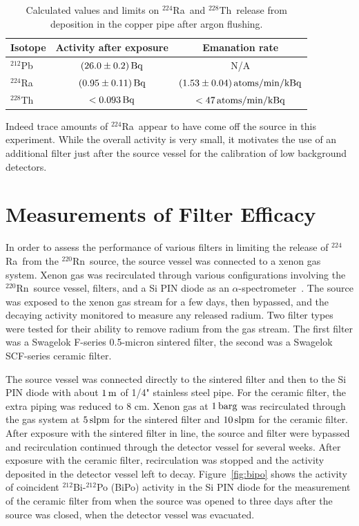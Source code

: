 \begin{table}[htb]
\centering
    \caption{Calculated values and limits on $^{224}$Ra~and $^{228}$Th~release from deposition in the copper pipe after argon flushing.}
    \label{tab:flush_limits}
    \renewcommand{\arraystretch}{1.2}
    \begin{tabular}{|lcc|}
        \hline\hline
        Isotope & Activity after exposure & Emanation rate \\ \hline
        $^{212}$Pb & $(26.0\pm0.2)\,\mathrm{Bq}$ & N/A \\
        $^{224}$Ra & $(0.95\pm0.11)\,\mathrm{Bq}$ & $(1.53\pm0.04)\,\mathrm{atoms/min/kBq}$ \\
        $^{228}$Th & $<0.093\,\mathrm{Bq}$ & $<47\,\mathrm{atoms/min/kBq}$ \\
        \hline\hline
    \end{tabular}
\end{table}

Indeed trace amounts of $^{224}$Ra~appear to have come off the source in this experiment. While the overall activity is very small, it motivates the use of an additional filter just after the source vessel for the calibration of low background detectors.

\section{Measurements of Filter Efficacy}
\label{sec:rn_filter}

In order to assess the performance of various filters in limiting the release of $^{224}$Ra~from the $^{220}$Rn~source, the source vessel was connected to a xenon gas system. Xenon gas was recirculated through various configurations involving the $^{220}$Rn~source vessel, filters, and a Si PIN diode as an $\alpha$-spectrometer~\cite{Bray:2014}. The source was exposed to the xenon gas stream for a few days, then bypassed, and the decaying activity monitored to measure any released radium. Two filter types were tested for their ability to remove radium from the gas stream. The first filter was a Swagelok F-series 0.5-micron sintered filter, the second was a Swagelok SCF-series ceramic filter.

The source vessel was connected directly to the sintered filter and then to the Si PIN diode with about $1\,\mathrm{m}$ of 1/4" stainless steel pipe. For the ceramic filter, the extra piping was reduced to 8 cm. Xenon gas at $1\,\mathrm{barg}$ was recirculated through the gas system at $5\,\mathrm{slpm}$ for the sintered filter and $10\,\mathrm{slpm}$ for the ceramic filter. After exposure with the sintered filter in line, the source and filter were bypassed and recirculation continued through the detector vessel for several weeks. After exposure with the ceramic filter, recirculation was stopped and the activity deposited in the detector vessel left to decay. Figure~\ref{fig:bipo} shows the activity of coincident $^{212}$Bi-$^{212}$Po (BiPo) activity in the Si PIN diode for the measurement of the ceramic filter from when the source was opened to three days after the source was closed, when the detector vessel was evacuated.

